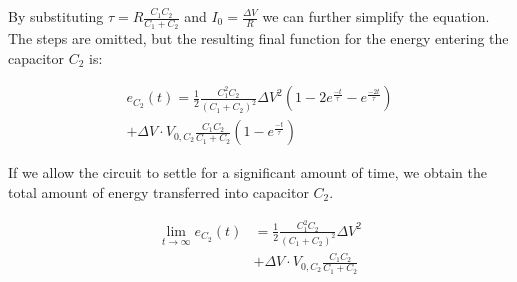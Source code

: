 By substituting $\tau=R\frac{C_1C_2}{C_1+C_2}$ and $I_0=\frac{\Delta V}{R}$ we can further simplify the equation. The steps are omitted, but the resulting final function for the energy entering the capacitor $C_2$ is:

\begin{multline}
    e_{C_2}(t) = \frac{1}{2}\frac{C_1^2C_2}{\left(C_1+C_2\right)^2}{\Delta V}^2\left(1-2e^\frac{-t}{\tau}-e^\frac{-2t}{\tau}\right) \\
               + \Delta V\cdot V_{0,C_2}\frac{C_1C_2}{C_1+C_2}\left(1-e^\frac{-t}{\tau}\right)
\end{multline}

If we allow the circuit to settle for a significant amount of time, we obtain the total amount of energy transferred into capacitor $C_2$.

\begin{equation}\begin{aligned}
    \lim_{t\to\infty} e_{C_2}(t) &= \frac{1}{2}\frac{C_1^2C_2}{\left(C_1+C_2\right)^2}{\Delta V}^2 \\
                                 &+ \Delta V\cdot V_{0,C_2}\frac{C_1C_2}{C_1+C_2}
    \label{eq:capacitor-energy}
\end{aligned}\end{equation}
